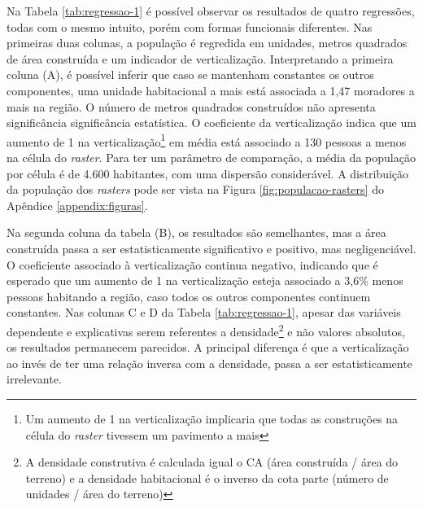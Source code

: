 Na Tabela \ref{tab:regressao-1} é possível observar os resultados de quatro regressões, todas com o mesmo intuito, porém com formas funcionais diferentes. Nas primeiras duas colunas, a população é regredida em unidades, metros quadrados de área construída e um indicador de verticalização. Interpretando a primeira coluna (A), é possível inferir que caso se mantenham constantes os outros componentes, uma unidade habitacional a mais está associada a 1,47 moradores a mais na região. O número de metros quadrados construídos não apresenta significância significância estatística. O coeficiente da verticalização indica que um aumento de 1 na verticalização\footnote{Um aumento de 1 na verticalização implicaria que todas as construções na célula do \textit{raster} tivessem um pavimento a mais} em média está associado a 130 pessoas a menos na célula do \textit{raster}. Para ter um parâmetro de comparação, a média da população por célula é de 4.600 habitantes, com uma dispersão considerável. A distribuição da população dos \textit{rasters} pode ser vista na Figura \ref{fig:populacao-rasters} do Apêndice \ref{appendix:figuras}. 

Na segunda coluna da tabela (B),  os resultados são semelhantes, mas a área construída passa a ser estatisticamente significativo e positivo, mas negligenciável. O coeficiente associado à verticalização continua negativo, indicando que é esperado que um aumento de 1 na verticalização esteja associado a 3,6\% menos pessoas habitando a região, caso todos os outros componentes continuem constantes. Nas colunas C e D da Tabela \ref{tab:regressao-1}, apesar das variáveis dependente e explicativas serem referentes a densidade\footnote{A densidade construtiva é calculada igual o CA (área construída / área do terreno) e a densidade habitacional é o inverso da cota parte (número de unidades / área do terreno)} e não valores absolutos, os resultados permanecem parecidos. A principal diferença é que a verticalização ao invés de ter uma relação inversa com a densidade, passa a ser estatisticamente irrelevante.

